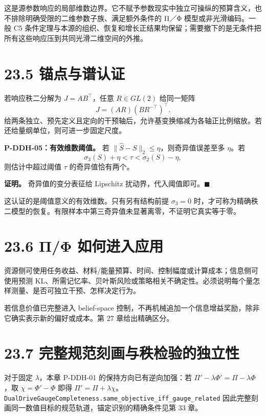 \documentclass[
  11pt,
  oneside]{book}
\begin{document}
这是源参数响应的局部维数边界。它不赋予参数现实中独立可操纵的预算含义，也不排除明确受限的二维参数子族、满足额外条件的 Π／Φ 模型或非光滑编码。一般 C5 条件定理与本源的组织、恢复和增长正结果均保留；需要撤下的是无条件把所有这些响应压到共同光滑二维空间的外推。

\section{23.5 锚点与谱认证}\label{ux951aux70b9ux4e0eux8c31ux8ba4ux8bc1}

若响应秩二分解为 \(J=AB^\top\)，任意 \(R\in GL(2)\) 给同一矩阵 \[J=(AR)(BR^{-\top})^\top.\] 给两条独立、预先定义且定向的干预轴后，允许基变换缩减为各轴正比例缩放。若还给量纲单位，则可进一步固定尺度。

\hypertarget{p-ddh-05}{}\label{p-ddh-05}

\textbf{P-DDH-05：有效维数阈值。} 若 \(\|\widehat S-S\|_2\le\eta\)，则奇异值误差至多 \(\eta\)。若 \[\sigma_3(S)+\eta<\tau<\sigma_2(S)-\eta,\] 则估计中超过阈值 \(\tau\) 的奇异值恰有两个。

\textbf{证明。} 奇异值的变分表征给 Lipschitz 扰动界，代入阈值即可。\(\blacksquare\)

这认证的是阈值意义的有效维数。只有另有结构前提 \(\sigma_3=0\) 时，才可称为精确秩二模型的恢复。有限样本中第三奇异值未显著离零，不证明它真实等于零。

\section{23.6 Π/Φ 如何进入应用}\label{ux3c0ux3c6-ux5982ux4f55ux8fdbux5165ux5e94ux7528}

资源侧可使用任务收益、材料/能量预算、时间、控制幅度或计算成本；信息侧可使用预测 KL、所需记忆率、贝叶斯风险或策略相关不确定性。必须说明每个量怎样测量、是否可独立干预、怎样决定行为。

若信息价值已完整进入 belief-space 控制，不再机械追加一个信息增益奖励，除非它确实表示新的偏好或成本。第 27 章给出精确区分。

\section{23.7 完整规范刻画与秩检验的独立性}\label{ux5b8cux6574ux89c4ux8303ux523bux753bux4e0eux79e9ux68c0ux9a8cux7684ux72ecux7acbux6027}

对于固定 \(\lambda\)，本章 P-DDH-01 的保持方向已有逆向加强：若 \(\Pi'-\lambda\Phi'=\Pi-\lambda\Phi\)，取 \(\chi=\Phi'-\Phi\) 即得 \(\Pi'=\Pi+\lambda\chi\)。\nolinkurl{DualDriveGaugeCompleteness.same_objective_iff_gauge_related} 因此完整刻画同一数值目标的规范轨道，锚定识别的精确条件见第 33 章。
\end{document}
